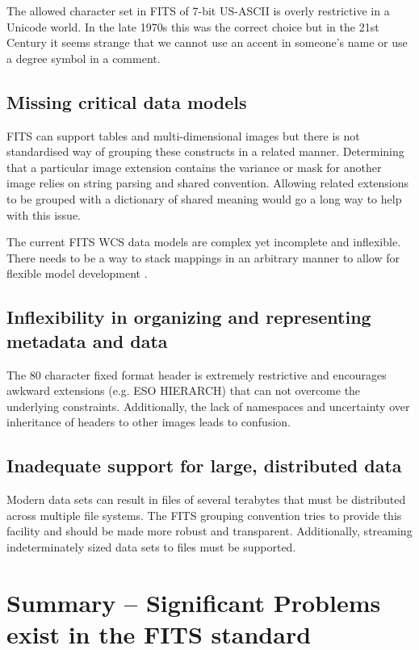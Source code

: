 \documentclass[11pt,twoside]{article}
\begin{document}
The allowed character set in FITS of 7-bit US-ASCII is overly
restrictive in a Unicode world. In the late 1970s this was the correct
choice but in the 21st Century it seems strange that we cannot use an
accent in someone's name or use a degree symbol in a comment.

\subsection{Missing critical data models}

FITS can support tables and multi-dimensional images but there is not
standardised way of grouping these constructs in a related
manner. Determining that a particular image extension contains the
variance or mask for another image relies on string parsing and shared
convention. Allowing related extensions to be grouped with a
dictionary of shared meaning would go a long way to help with this
issue.

The current FITS WCS data models are complex yet incomplete and
inflexible. There needs to be a way to stack mappings in an arbitrary
manner to allow for flexible model development \citep[see
e.g.][]{O35_adassxxii,2012ASPC..461..825B}.


\subsection{Inflexibility in organizing and representing metadata and
  data}

The 80 character fixed format header is extremely restrictive and
encourages awkward extensions (e.g. ESO HIERARCH) that can not
overcome the underlying constraints. Additionally, the lack of
namespaces and uncertainty over inheritance of headers to other images
leads to confusion.

\subsection{Inadequate support for large, distributed data}

Modern data sets can result in files of several terabytes that must be
distributed across multiple file systems. The FITS grouping convention
tries to provide this facility and should be made more robust and
transparent. Additionally, streaming indeterminately sized data sets
to files must be supported.


\section{Summary -- Significant Problems exist in the FITS standard}
\end{document}
